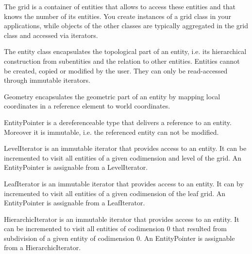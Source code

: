\documentclass[11pt,a4paper,headinclude,footinclude,DIV16,normalheadings]{scrreprt}
\begin{document}
    The grid 
    is a container of entities that allows to access these entities
    and that knows the number of its entities. You create instances of
    a grid class in your applications, while objects of the other
    classes are typically aggregated in the grid class and accessed via
    iterators. 


    The entity class encapsulates
    the topological part of an entity, i.e. its hierarchical
    construction from subentities and the relation to other
    entities. Entities cannot be created, copied or modified by the
    user. They can only be read-accessed through immutable iterators. 


    Geometry
    encapsulates the geometric part of an entity by mapping local
    coordinates in a reference element to world coordinates. 


    EntityPointer  is a
    dereferenceable type that delivers a reference to an
    entity. Moreover it is immutable, i.e. the referenced entity can
    not be modified. 


    LevelIterator  is an
    immutable iterator that provides access to an entity. It can be
    incremented to visit all entities of a given
    codimension and level of the grid. An EntityPointer is
    assignable from a LevelIterator. 


    LeafIterator is an
    immutable iterator that provides access to an entity. It can by
    incremented to visit all entities of a given
    codimension of the leaf grid. An EntityPointer is assignable
    from a LeafIterator. 


    HierarchicIterator 
    is an immutable iterator that provides access to an entity. It can
    be incremented to visit all entities of
    codimension 0 that resulted from subdivision of a given entity of
    codimension 0. An EntityPointer is assignable from a
    HierarchicIterator. 
\end{document}
